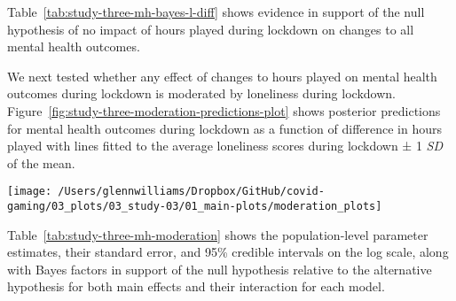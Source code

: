\documentclass[
  english,
  man,floatsintext]{apa6}
\begin{document}
Table~\ref{tab:study-three-mh-bayes-l-diff} shows evidence in support of the null hypothesis of no impact of hours played during lockdown on changes to all mental health outcomes.

We next tested whether any effect of changes to hours played on mental health outcomes during lockdown is moderated by loneliness during lockdown. Figure~\ref{fig:study-three-moderation-predictions-plot} shows posterior predictions for mental health outcomes during lockdown as a function of difference in hours played with lines fitted to the average loneliness scores during lockdown ± 1 \emph{SD} of the mean.

\begin{figure*}[!htbp]

{\centering \texttt{[image: /Users/glennwilliams/Dropbox/GitHub/covid-gaming/03\_plots/03\_study-03/01\_main-plots/moderation\_plots]} 

}

\caption{Mental health outcomes for the depression, anxiety, and stress measures as a function of the difference in hours played before and during lockdown and loneliness scores during lockdown. Lines and ribbons indicate the posterior mean ± 95\% credible intervals, with each line representing the mean loneliness score ± 1 SD.}\label{fig:study-three-moderation-predictions-plot}
\end{figure*}

Table~\ref{tab:study-three-mh-moderation} shows the population-level parameter estimates, their standard error, and 95\% credible intervals on the log scale, along with Bayes factors in support of the null hypothesis relative to the alternative hypothesis for both main effects and their interaction for each model.
\end{document}
